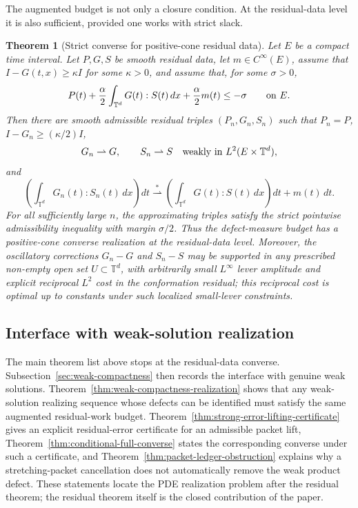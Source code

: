 \documentclass[11pt]{article}
\numberwithin{equation}{section}
\newtheorem{maintheorem}{Theorem}
\begin{document}
The augmented budget is not only a closure condition.  At the residual-data
level it is also sufficient, provided one works with strict slack.

\begin{maintheorem}[Strict converse for positive-cone residual data]
\label{thm:intro-strict-augmented-converse}
Let \(E\) be a compact time interval.  Let \(P,G,S\) be smooth residual data,
let \(m\in C^\infty(E)\), assume that \(I-G(t,x)\ge\kappa I\) for some
\(\kappa>0\), and assume that, for some \(\sigma>0\),
\[
  P(t)+\frac{\alpha}{2}\int_{\mathbb T^d}G(t):S(t)\,dx
  +\frac{\alpha}{2}m(t)\le-\sigma
  \qquad\hbox{on }E .
\]
Then there are smooth admissible residual triples
\((P_n,G_n,S_n)\) such that \(P_n=P\), \(I-G_n\ge(\kappa/2)I\),
\[
  G_n\rightharpoonup G,\qquad S_n\rightharpoonup S
  \quad\hbox{weakly in }L^2(E\times\mathbb T^d),
\]
and
\[
  \left(\int_{\mathbb T^d}G_n(t):S_n(t)\,dx\right)dt
  \stackrel{*}{\rightharpoonup}
  \left(\int_{\mathbb T^d}G(t):S(t)\,dx\right)dt+m(t)\,dt .
\]
For all sufficiently large \(n\), the approximating triples satisfy the strict
pointwise admissibility inequality with margin \(\sigma/2\).  Thus the
defect-measure budget has a positive-cone converse realization at the
residual-data level.  Moreover, the oscillatory corrections \(G_n-G\) and
\(S_n-S\) may be supported in any prescribed non-empty open set
\(U\subset\mathbb T^d\), with arbitrarily small \(L^\infty\) lever amplitude
and explicit reciprocal \(L^2\) cost in the conformation residual; this
reciprocal cost is optimal up to constants under such localized small-lever
constraints.
\end{maintheorem}

\subsection*{Interface with weak-solution realization}

The main theorem list above stops at the residual-data converse.  Subsection~\ref{sec:weak-compactness}
then records the interface with genuine weak solutions.  Theorem~\ref{thm:weak-compactness-realization}
shows that any weak-solution realizing sequence whose defects can be identified
must satisfy the same augmented residual-work budget.  Theorem~\ref{thm:strong-error-lifting-certificate}
gives an explicit residual-error certificate for an admissible packet lift,
Theorem~\ref{thm:conditional-full-converse} states the corresponding converse
under such a certificate, and Theorem~\ref{thm:packet-ledger-obstruction} explains why a
stretching-packet cancellation does not automatically remove the weak product
defect.  These statements locate the PDE realization problem after the
residual theorem; the residual theorem itself is the closed contribution of the
paper.
\end{document}
